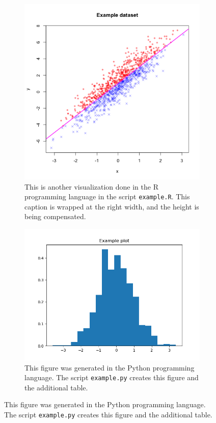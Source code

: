 \documentclass[english, twoside, 12pt, a4paper]{article}
\theoremstyle{definition}
\theoremstyle{plain}
\theoremstyle{remark}
\newcommand{\code}[1]{\lstinline{#1}}
\begin{document}
\begin{figure}[hbt]
  \centering
  \begin{subfigure}[t]{0.45\textwidth}
    \includegraphics[width=\textwidth]{./figs/fig_01.png}
    \caption{This is another visualization done in the R programming language in the script \code{example.R}. This caption is wrapped at the right width, and the height is being compensated.}
    \label{fig:xxxa}
  \end{subfigure}
  \hfill
  \begin{subfigure}[t]{0.45\textwidth}
    \includegraphics[width=\textwidth]{./figs/fig_02.png}
    \caption{This figure was generated in the Python programming language. The script \code{example.py} creates this figure and the additional table.}
    \label{fig:xxxb}
  \end{subfigure}
  

\end{figure}
\end{document}
